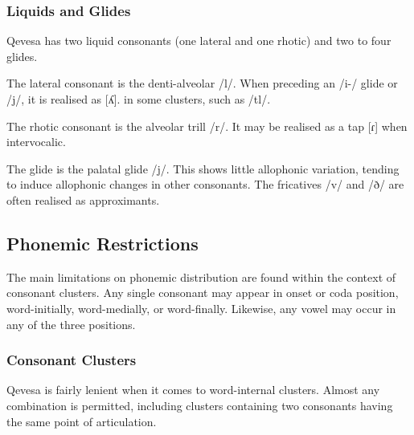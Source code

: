 \documentclass[grammar]{subfiles}
\begin{document}
  \subsubsection{Liquids and Glides}
  \label{sssec:liquids}

  Qevesa has two liquid consonants (one lateral and one rhotic) and two to four glides.

  The lateral consonant is the denti-alveolar /l/. When preceding an /i-/ glide
  or /j/, it is realised as [ʎ].  %
  in some clusters, such as /tl/.

  The rhotic consonant is the alveolar trill /r/.  It may be realised as a tap
  [ɾ] when intervocalic.  

  The glide is the palatal glide /j/.  This shows little allophonic variation,
  tending to induce allophonic changes in other consonants.  The fricatives /v/
  and /ð/ are often realised as approximants.  

  \subsection{Phonemic Restrictions}
  \label{ssec:phonemic_restrictions}

  The main limitations on phonemic distribution are found within the context of
  consonant clusters.  Any single consonant may appear in onset or coda
  position, word-initially, word-medially, or word-finally.  Likewise, any
  vowel may occur in any of the three positions. 

  \subsubsection{Consonant Clusters}
  \label{sssec:consonant_clusters}

  Qevesa is fairly lenient when it comes to word-internal clusters.  Almost any
  combination is permitted, including clusters containing two consonants having
  the same point of articulation. 

\end{document}
